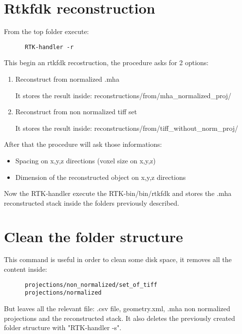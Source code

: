 \documentclass[a4paper,11pt, oneside]{article}
\begin{document}
    \section{ Rtkfdk reconstruction }
    From the top folder execute:
    \begin{lstlisting}
      RTK-handler -r
    \end{lstlisting}
    
    This begin an rtkfdk recostruction, the procedure asks for 2 options:
    \begin{enumerate}
      \item Reconstruct from normalized .mha
      \par It stores the result inside:
      \newline
      reconstructions/from/mha\_normalized\_proj/
      \item Reconstruct from non normalized tiff set
      \par It stores the result inside:
      \newline
      reconstructions/from/tiff\_without\_norm\_proj/
    \end{enumerate}
    After that the procedure will ask those informations:
      \begin{itemize}
        \item Spacing on x,y,z directions (voxel size on x,y,z)
        \item Dimension of the reconstructed object on x,y,z directions
      \end{itemize}
      
      Now the RTK-handler execute the RTK-bin/bin/rtkfdk and stores the .mha reconstructed stack inside the folders previously described.
    \section{ Clean the folder structure }
    This command is useful in order to clean some disk space, it removes all the content inside:
    \begin{lstlisting}
      projections/non_normalized/set_of_tiff
      projections/normalized
    \end{lstlisting}
    But leaves all the relevant file: .csv file, geometry.xml, .mha non normalized projections and the reconstructed stack.
    It also deletes the previously created folder structure with "RTK-handler -s".
    
  
\end{document}
